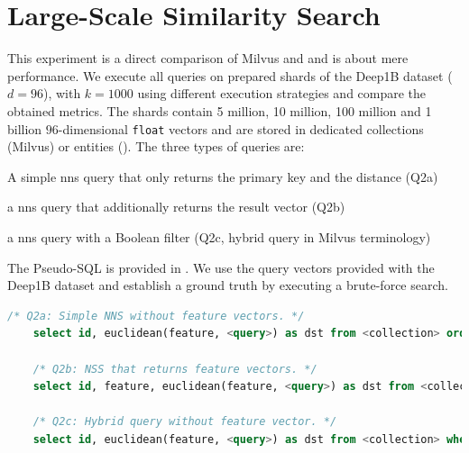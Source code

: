 \section{Large-Scale Similarity Search}
This experiment is a direct comparison of Milvus and \cottontail{} and is about mere performance. We execute all queries on prepared shards of the Deep1B \cite{Babenko:2016Efficient} dataset ($d=96$), with $k=1000$ using different execution strategies and compare the obtained metrics. The shards contain 5 million, 10 million, 100 million and 1 billion $96$-dimensional \texttt{float} vectors and are stored in dedicated collections (Milvus) or entities (\cottontail). The three types of queries are:
\begin{enumerate*}[label=(\roman*),itemjoin={{, }}, itemjoin*={{, and, }}, after={{.}}]
    \item A simple \acrshort{nns} query that only returns the primary key and the distance (Q2a)
    \item a \acrshort{nns} query that additionally returns the result vector (Q2b)
    \item a \acrshort{nns} query with a Boolean filter (Q2c, hybrid query in Milvus terminology)
\end{enumerate*} 
The Pseudo-SQL is provided in . We use the query vectors provided with the Deep1B dataset and establish a ground truth by executing a brute-force search.

\begin{lstlisting}[language=SQL, caption={Pseudo-SQL of the queries executed for this measurement.}, label=listing:big_nns_query, numbers=none]
    /* Q2a: Simple NNS without feature vectors. */
    select id, euclidean(feature, <query>) as dst from <collection> order by dst limit 1000
    
    /* Q2b: NSS that returns feature vectors. */
    select id, feature, euclidean(feature, <query>) as dst from <collection> order by dst limit 1000

    /* Q2c: Hybrid query without feature vector. */
    select id, euclidean(feature, <query>) as dst from <collection> where category = <category> order by dst limit 1000
\end{lstlisting}

